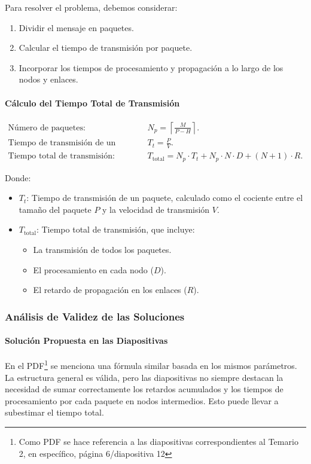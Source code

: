 \documentclass[a4paper,12pt]{article}
\begin{document}
Para resolver el problema, debemos considerar:
\begin{enumerate}
    \item Dividir el mensaje en paquetes.
    \item Calcular el tiempo de transmisión por paquete.
    \item Incorporar los tiempos de procesamiento y propagación a lo largo de los nodos y enlaces.
\end{enumerate}

\paragraph{Cálculo del Tiempo Total de Transmisión}

\begin{align*}
    \text{Número de paquetes: } & \, N_p = \left\lceil \frac{M}{P - H} \right\rceil. \\
    \text{Tiempo de transmisión de un paquete: } & \, T_t = \frac{P}{V}. \\
    \text{Tiempo total de transmisión: } & \, T_{\text{total}} = N_p \cdot T_t + N_p \cdot N \cdot D + (N+1) \cdot R.
\end{align*}

Donde:
\begin{itemize}
    \item \( T_t \): Tiempo de transmisión de un paquete, calculado como el cociente entre el tamaño del paquete \( P \) y la velocidad de transmisión \( V \).
    \item \( T_{\text{total}} \): Tiempo total de transmisión, que incluye:
    \begin{itemize}
        \item La transmisión de todos los paquetes.
        \item El procesamiento en cada nodo (\( D \)).
        \item El retardo de propagación en los enlaces (\( R \)).
    \end{itemize}
\end{itemize}

\subsubsection*{Análisis de Validez de las Soluciones}

\paragraph{Solución Propuesta en las Diapositivas}
En el PDF\footnote{Como PDF se hace referencia a las diapositivas correspondientes al Temario 2, en específico, página 6/diapositiva 12} se menciona una fórmula similar basada en los mismos parámetros. La estructura general es válida, pero las diapositivas no siempre destacan la necesidad de sumar correctamente los retardos acumulados y los tiempos de procesamiento por cada paquete en nodos intermedios. Esto puede llevar a subestimar el tiempo total.
\end{document}
